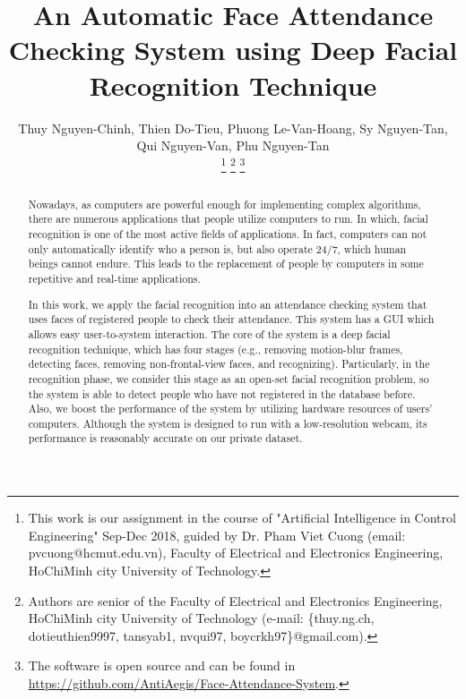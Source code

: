 \documentclass[journal, twocolumn]{IEEEtran}
\begin{document}
\title{An Automatic Face Attendance Checking System using Deep Facial Recognition Technique}


\author{Thuy Nguyen-Chinh,
		Thien Do-Tieu,
		Phuong Le-Van-Hoang,
		Sy Nguyen-Tan,
		Qui Nguyen-Van,
		Phu Nguyen-Tan

\thanks{This work is our assignment in the course of "Artificial Intelligence in Control Engineering" Sep-Dec 2018, guided by Dr. Pham Viet Cuong (email: pvcuong@hcmut.edu.vn), Faculty of Electrical and Electronics Engineering, HoChiMinh city University of Technology.}
\thanks{Authors are senior of the Faculty of Electrical and Electronics Engineering, HoChiMinh city University of Technology (e-mail: \{thuy.ng.ch, dotieuthien9997, tansyab1, nvqui97, boycrkh97\}@gmail.com).}
\thanks{The software is open source and can be found in \url{https://github.com/AntiAegis/Face-Attendance-System}.}
}


\maketitle


\begin{abstract}
Nowadays, as computers are powerful enough for implementing complex algorithms, there are numerous applications that people utilize computers to run. In which, facial recognition is one of the most active fields of applications. In fact, computers can not only automatically identify who a person is, but also operate 24/7, which human beings cannot endure. This leads to the replacement of people by computers in some repetitive and real-time applications.

In this work, we apply the facial recognition into an attendance checking system that uses faces of registered people to check their attendance. This system has a GUI which allows easy user-to-system interaction. The core of the system is a deep facial recognition technique, which has four stages (e.g., removing motion-blur frames, detecting faces, removing non-frontal-view faces, and recognizing). Particularly, in the recognition phase, we consider this stage as an open-set facial recognition problem, so the system is able to detect people who have not registered in the database before. Also, we boost the performance of the system by utilizing hardware resources of users' computers. Although the system is designed to run with a low-resolution webcam, its performance is reasonably accurate on our private dataset.
\end{abstract}
\end{document}
